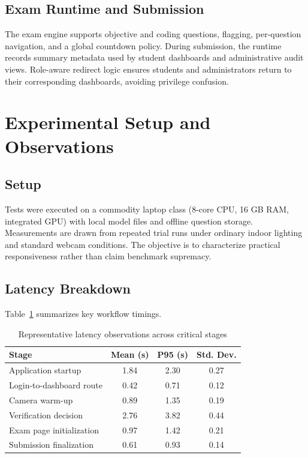 \documentclass[conference]{IEEEtran}
\begin{document}
\subsection{Exam Runtime and Submission}
The exam engine supports objective and coding questions, flagging, per-question navigation, and a global countdown policy. During submission, the runtime records summary metadata used by student dashboards and administrative audit views. Role-aware redirect logic ensures students and administrators return to their corresponding dashboards, avoiding privilege confusion.

\section{Experimental Setup and Observations}
\subsection{Setup}
Tests were executed on a commodity laptop class (8-core CPU, 16 GB RAM, integrated GPU) with local model files and offline question storage. Measurements are drawn from repeated trial runs under ordinary indoor lighting and standard webcam conditions. The objective is to characterize practical responsiveness rather than claim benchmark supremacy.

\subsection{Latency Breakdown}
Table~\ref{tab:latency} summarizes key workflow timings.

\begin{table}[h]
\caption{Representative latency observations across critical stages}
\label{tab:latency}
\centering
\begin{tabular}{lccc}
\toprule
\textbf{Stage} & \textbf{Mean (s)} & \textbf{P95 (s)} & \textbf{Std. Dev.} \\
\midrule
Application startup & 1.84 & 2.30 & 0.27 \\
Login-to-dashboard route & 0.42 & 0.71 & 0.12 \\
Camera warm-up & 0.89 & 1.35 & 0.19 \\
Verification decision & 2.76 & 3.82 & 0.44 \\
Exam page initialization & 0.97 & 1.42 & 0.21 \\
Submission finalization & 0.61 & 0.93 & 0.14 \\
\bottomrule
\end{tabular}
\end{table}
\end{document}

